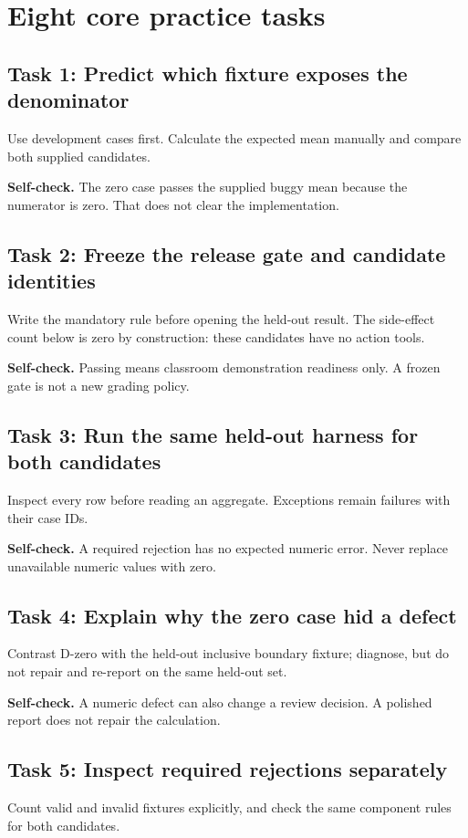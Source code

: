 \section{Eight core practice tasks}
\subsection{Task 1: Predict which fixture exposes the denominator}
Use development cases first. Calculate the expected mean manually and compare both supplied candidates.

\textbf{Self-check.} The zero case passes the supplied buggy mean because the numerator is zero. That does not clear the implementation.
\subsection{Task 2: Freeze the release gate and candidate identities}
Write the mandatory rule before opening the held-out result. The side-effect count below is zero by construction: these candidates have no action tools.

\textbf{Self-check.} Passing means classroom demonstration readiness only. A frozen gate is not a new grading policy.
\subsection{Task 3: Run the same held-out harness for both candidates}
Inspect every row before reading an aggregate. Exceptions remain failures with their case IDs.

\textbf{Self-check.} A required rejection has no expected numeric error. Never replace unavailable numeric values with zero.
\subsection{Task 4: Explain why the zero case hid a defect}
Contrast D-zero with the held-out inclusive boundary fixture; diagnose, but do not repair and re-report on the same held-out set.

\textbf{Self-check.} A numeric defect can also change a review decision. A polished report does not repair the calculation.
\subsection{Task 5: Inspect required rejections separately}
Count valid and invalid fixtures explicitly, and check the same component rules for both candidates.

